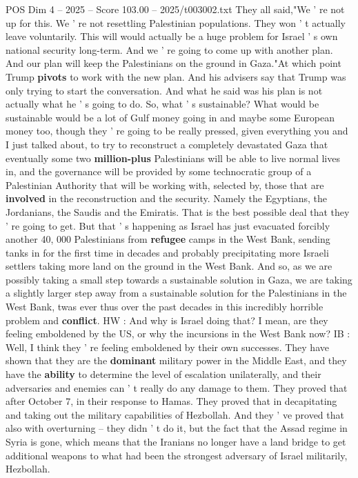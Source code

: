 \begin{textsample}{POS Dim 4 – 2025 – Score 103.00 – 2025/t003002.txt}
They all said,"We ' re not up for this.
We ' re not resettling Palestinian populations.
They won ' t actually leave voluntarily.
This will would actually be a huge problem for Israel ' s own national security long-term.
And we ' re going to come up with another plan.
And our plan will keep the Palestinians on the ground in Gaza."At which point Trump \textbf{pivots} to work with the new plan.
And his advisers say that Trump was only trying to start the conversation.
And what he said was his plan is not actually what he ' s going to do.
So, what ' s sustainable?
What would be sustainable would be a lot of Gulf money going in and maybe some European money too, though they ' re going to be really pressed, given everything you and I just talked about, to try to reconstruct a completely devastated Gaza that eventually some two \textbf{million-plus} Palestinians will be able to live normal lives in, and the governance will be provided by some technocratic group of a Palestinian Authority that will be working with, selected by, those that are \textbf{involved} in the reconstruction and the security.
Namely the Egyptians, the Jordanians, the Saudis and the Emiratis.
That is the best possible deal that they ' re going to get.
But that ' s happening as Israel has just evacuated forcibly another 40, 000 Palestinians from \textbf{refugee} camps in the West Bank, sending tanks in for the first time in decades and probably precipitating more Israeli settlers taking more land on the ground in the West Bank.
And so, as we are possibly taking a small step towards a sustainable solution in Gaza, we are taking a slightly larger step away from a sustainable solution for the Palestinians in the West Bank, twas ever thus over the past decades in this incredibly horrible problem and \textbf{conflict}.
HW : And why is Israel doing that?
I mean, are they feeling emboldened by the US, or why the incursions in the West Bank now?
IB : Well, I think they ' re feeling emboldened by their own successes.
They have shown that they are the \textbf{dominant} military power in the Middle East, and they have the \textbf{ability} to determine the level of escalation unilaterally, and their adversaries and enemies can ' t really do any damage to them.
They proved that after October 7, in their response to Hamas.
They proved that in decapitating and taking out the military capabilities of Hezbollah.
And they ' ve proved that also with overturning -- they didn ' t do it, but the fact that the Assad regime in Syria is gone, which means that the Iranians no longer have a land bridge to get additional weapons to what had been the strongest adversary of Israel militarily, Hezbollah.

\end{textsample}
